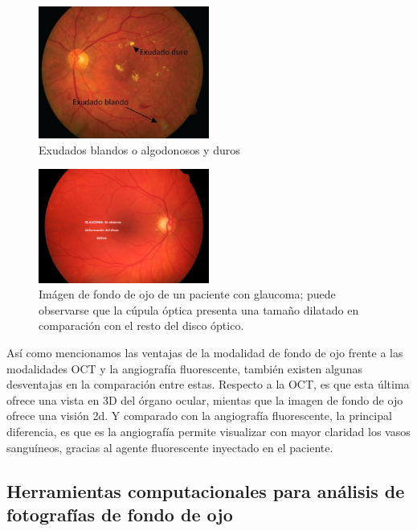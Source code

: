 \begin{figure}[H]
	{
	\centering
	\includegraphics[width=0.5\textwidth]{Figures/Exudados}
	\caption[Exudados]{Exudados blandos o algodonosos y duros}
	\label{fig:Exudados blandos o algodonosos y duros}
	}
\end{figure}

\begin{figure}[H]
	{
	\centering
	\includegraphics[width=0.5\textwidth]{Figures/Glaucoma}
	\caption[Glaucoma]{Im\'agen de fondo de ojo de un paciente con glaucoma; puede observarse que la c\'upula \'optica presenta una tama\~no dilatado en comparaci\'on con el resto del disco \'optico.}
	\label{fig:Ojo afectado por Glaucoma.}
	}
\end{figure}

As\'i como mencionamos las ventajas de la modalidad de fondo de ojo frente a las modalidades OCT y la angiograf\'ia fluorescente, tambi\'en existen algunas desventajas en la comparaci\'on entre estas. Respecto a la OCT, es que esta \'ultima ofrece una vista en 3D del \'organo ocular, mientas que la imagen de fondo de ojo ofrece una visi\'on 2d. Y comparado con la angiograf\'ia fluorescente, la principal diferencia, es que es la angiograf\'ia permite visualizar con mayor claridad los vasos sangu\'ineos, gracias al agente fluorescente inyectado en el paciente.

\subsection{Herramientas computacionales para an\'alisis de fotograf\'ias de fondo de ojo}

